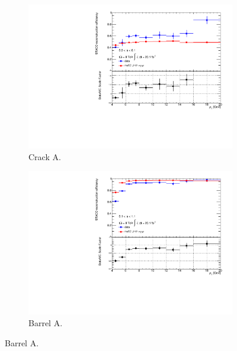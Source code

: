 \begin{figure}[htbp]
  \centering
    \begin{subfigure}[b]{0.45\textwidth}
      \includegraphics[width=\textwidth]{PartCalibration2012/Plots/SFPlots/Crack_A_reco.pdf}
      \caption{Crack A.}\label{fig:CalibrationRecoSFCrackA}
    \end{subfigure}
    \hfill
    \begin{subfigure}[b]{0.45\textwidth}
      \includegraphics[width=\textwidth]{PartCalibration2012/Plots/SFPlots/Barrel_A_reco.pdf}
      \caption{Barrel A.}\label{fig:CalibrationRecoSFBarrelA}
    \end{subfigure}


\end{figure}
